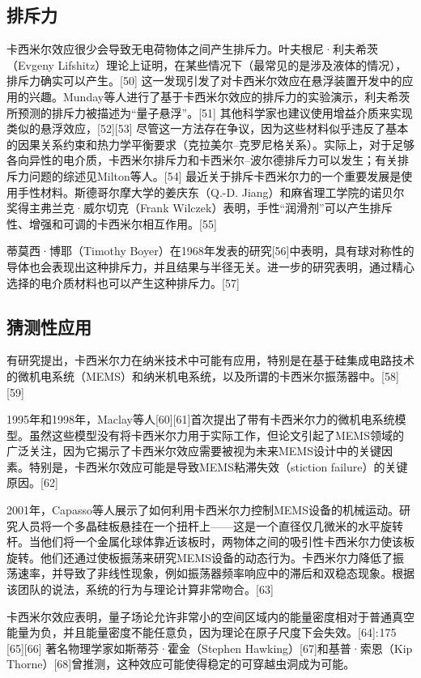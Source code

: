 \subsection{排斥力}
卡西米尔效应很少会导致无电荷物体之间产生排斥力。叶夫根尼·利夫希茨（Evgeny Lifshitz）理论上证明，在某些情况下（最常见的是涉及液体的情况），排斥力确实可以产生。[50] 这一发现引发了对卡西米尔效应在悬浮装置开发中的应用的兴趣。Munday等人进行了基于卡西米尔效应的排斥力的实验演示，利夫希茨所预测的排斥力被描述为“量子悬浮”。[51] 其他科学家也建议使用增益介质来实现类似的悬浮效应，[52][53] 尽管这一方法存在争议，因为这些材料似乎违反了基本的因果关系约束和热力学平衡要求（克拉美尔–克罗尼格关系）。实际上，对于足够各向异性的电介质，卡西米尔排斥力和卡西米尔–波尔德排斥力可以发生；有关排斥力问题的综述见Milton等人。[54] 最近关于排斥卡西米尔力的一个重要发展是使用手性材料。斯德哥尔摩大学的姜庆东（Q.-D. Jiang）和麻省理工学院的诺贝尔奖得主弗兰克·威尔切克（Frank Wilczek）表明，手性“润滑剂”可以产生排斥性、增强和可调的卡西米尔相互作用。[55]

蒂莫西·博耶（Timothy Boyer）在1968年发表的研究[56]中表明，具有球对称性的导体也会表现出这种排斥力，并且结果与半径无关。进一步的研究表明，通过精心选择的电介质材料也可以产生这种排斥力。[57]
\subsection{猜测性应用}
有研究提出，卡西米尔力在纳米技术中可能有应用，特别是在基于硅集成电路技术的微机电系统（MEMS）和纳米机电系统，以及所谓的卡西米尔振荡器中。[58][59]

1995年和1998年，Maclay等人[60][61]首次提出了带有卡西米尔力的微机电系统模型。虽然这些模型没有将卡西米尔力用于实际工作，但论文引起了MEMS领域的广泛关注，因为它揭示了卡西米尔效应需要被视为未来MEMS设计中的关键因素。特别是，卡西米尔效应可能是导致MEMS粘滞失效（stiction failure）的关键原因。[62]

2001年，Capasso等人展示了如何利用卡西米尔力控制MEMS设备的机械运动。研究人员将一个多晶硅板悬挂在一个扭杆上——这是一个直径仅几微米的水平旋转杆。当他们将一个金属化球体靠近该板时，两物体之间的吸引性卡西米尔力使该板旋转。他们还通过使板振荡来研究MEMS设备的动态行为。卡西米尔力降低了振荡速率，并导致了非线性现象，例如振荡器频率响应中的滞后和双稳态现象。根据该团队的说法，系统的行为与理论计算非常吻合。[63]

卡西米尔效应表明，量子场论允许非常小的空间区域内的能量密度相对于普通真空能量为负，并且能量密度不能任意负，因为理论在原子尺度下会失效。[64]: 175 [65][66] 著名物理学家如斯蒂芬·霍金（Stephen Hawking）[67]和基普·索恩（Kip Thorne）[68]曾推测，这种效应可能使得稳定的可穿越虫洞成为可能。